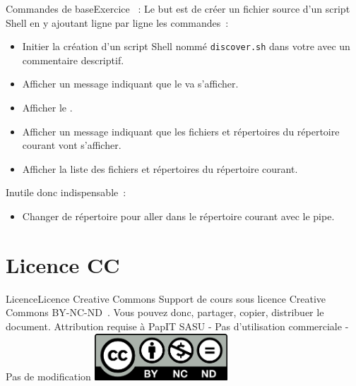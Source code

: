 \documentclass{beamer}
\begin{document}
    \begin{frame}{Commandes de base}{Exercice \execcounterdispinc{}~:}
        Le but est de créer un fichier source d'un script Shell en y ajoutant ligne par ligne les commandes~:
        \begin{itemize}
            \item Initier la création d'un script Shell nommé \lstinline{discover.sh} dans votre  avec un commentaire descriptif.
            \item Afficher un message indiquant que le  va s'afficher.
            \item Afficher le .
            \item Afficher un message indiquant que les fichiers et répertoires du répertoire courant vont s'afficher.
            \item Afficher la liste des fichiers et répertoires du répertoire courant.
        \end{itemize}

        Inutile donc indispensable~:
        \begin{itemize}
            \item Changer de répertoire pour aller dans le répertoire courant avec le pipe.
        \end{itemize}
    \end{frame}


    \section{Licence CC}\label{sec:licence}

    \begin{frame}{Licence}{Licence Creative Commons}
        Support de cours sous licence Creative Commons BY-NC-ND~.
        \bigbreak
        Vous pouvez donc, partager, copier, distribuer le document.
        \bigbreak
        Attribution requise à PapIT SASU - Pas d’utilisation commerciale - Pas de modification
        \bigbreak
        \centering
        \includegraphics[width=5cm]{image/by-nc-nd-logo}
    \end{frame}
\end{document}

